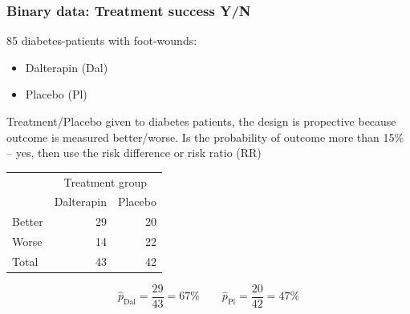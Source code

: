 \documentclass[handout,12pt,dvipsnames,t]{beamer}
\begin{document}
\begin{frame}[fragile]
\frametitle{Binary data: Treatment success Y/N}
85 diabetes-patients with foot-wounds:
\begin{itemize}
\item Dalterapin (Dal)
\item Placebo (Pl)
\end{itemize}

Treatment/Placebo given to diabetes patients, the design is
propective because outcome is measured better/worse. Is the probability of outcome more than 15\% -- yes, then use the risk difference or risk ratio (RR) 


\begin{center}
\begin{tabular}{l|r|r}
\hline
\multicolumn{1}{c|}{ } & \multicolumn{2}{|c}{Treatment group} \\
\cline{2-3}
  & Dalterapin & Placebo\\
\hline
Better & 29 & 20\\
\hline
Worse & 14 & 22\\
\hline
Total & 43 & 42\\
\hline
\end{tabular}\end{center}

\[
\hat p_\text{Dal} = \frac{29}{43} = 67\% \qquad
\hat p_\text{Pl}  = \frac{20}{42} = 47\%
\]

\end{frame}
\end{document}
